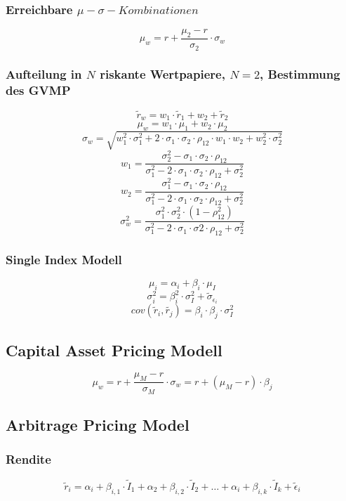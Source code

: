 \subsubsection{Erreichbare \(\mu-\sigma-Kombinationen\)}
\[\mu_w = r + \frac{\mu_2 - r}{\sigma_2} \cdot \sigma_w \]


\subsubsection{Aufteilung in \(N\) riskante Wertpapiere, \(N = 2\), Bestimmung des GVMP}
\[\tilde{r}_w = w_1 \cdot \tilde{r}_1 + w_2 + \tilde{r}_2\]
\[\mu_w = w_1 \cdot \mu_1 + w_2 \cdot \mu_2\]
\[\sigma_w = \sqrt{w_1^2 \cdot \sigma_1^2 + 2 \cdot \sigma_1 \cdot \sigma_2 \cdot \rho_{12} \cdot w_1 \cdot w_2 + w_2^2 \cdot \sigma_2^2}\]
\[w_1 = \frac{\sigma_2^2-\sigma_1 \cdot \sigma_2 \cdot \rho_{12}}{\sigma_1^2-2 \cdot \sigma_1 \cdot \sigma_2 \cdot \rho_{12} + \sigma_2^2}\]
\[w_2 = \frac{\sigma_1^2 - \sigma_1 \cdot \sigma_2 \cdot \rho_{12}}{\sigma_1^2 - 2 \cdot \sigma_1 \cdot \sigma_2 \cdot \rho_{12} + \sigma_2^2}\]
\[\sigma_w^2 = \frac{\sigma_1^2 \cdot \sigma_2^2 \cdot (1 - \rho_{12}^2)}{\sigma_1^2 - 2 \cdot \sigma_1 \cdot \sigma2 \cdot \rho_{12} + \sigma_2^2}\]

\subsubsection{Single Index Modell}
\[\mu_i = \alpha_i + \beta_i \cdot \mu_I\]
\[\sigma_i^2 = \beta_i^2 \cdot \sigma_I^2 + \tilde{\sigma}_{\epsilon_i}\]
\[cov(\tilde{r}_i, \tilde{r_j}) = \beta_i \cdot \beta_j \cdot \sigma_I^2\]


\subsection{Capital Asset Pricing Modell}
\[\mu_w = r + \frac{\mu_M - r}{\sigma_M} \cdot \sigma_w = r + (\mu_M - r) \cdot \beta_j\]


\subsection{Arbitrage Pricing Model}

\subsubsection{Rendite}
\[\tilde{r}_i = \alpha_i + \beta_{i,1} \cdot \tilde{I}_1 + \alpha_2 + \beta_{i,2} \cdot \tilde{I}_2 + \dots + \alpha_i + \beta_{i,k} \cdot \tilde{I}_k + \tilde{\epsilon}_i\]


